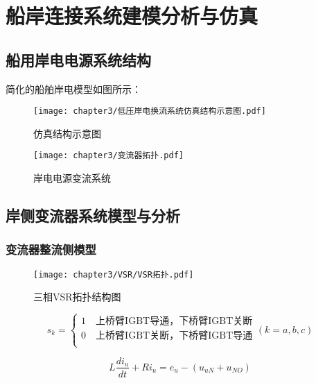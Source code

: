 \chapter{船岸连接系统建模分析与仿真}

\section{船用岸电电源系统结构}

简化的船舶岸电模型如图所示：

\begin{figure}[!htp]
	\centering
	\texttt{[image: chapter3/低压岸电换流系统仿真结构示意图.pdf]}
	\caption{仿真结构示意图}
	\label{fig:仿真结构示意图}
\end{figure}

\begin{figure}[!htp]
	\centering
	\texttt{[image: chapter3/变流器拓扑.pdf]}
	\caption{岸电电源变流系统}
	\label{fig:岸电电源变流系统}
\end{figure}



\section{岸侧变流器系统模型与分析}


\subsection{变流器整流侧模型}

\zhlipsum[1]

\begin{figure}[!htp]
	\centering
	\texttt{[image: chapter3/VSR/VSR拓扑.pdf]}
	\caption{三相VSR拓扑结构图}
	\label{fig:三相VSR拓扑结构图}
\end{figure}

\begin{equation}
	s_{k} =
	\begin{cases}
		1 \quad \text{上桥臂IGBT导通，下桥臂IGBT关断} \\
		0 \quad \text{上桥臂IGBT关断，下桥臂IGBT导通} \\
	\end{cases}
	(k=a,b,c)
	\label{equ:Sk}
\end{equation}

\begin{equation}
	L\frac{di_{u}}{dt}+Ri_{u}=e_{u}-(u_{uN}+u_{NO})
	\label{equ:3-3}
\end{equation}

